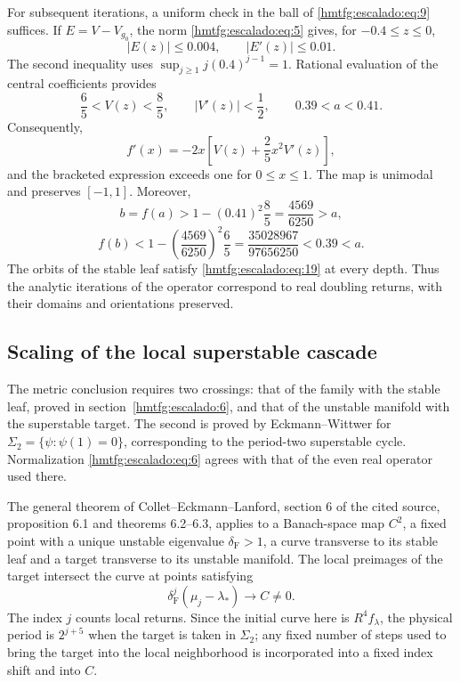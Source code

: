 For subsequent iterations, a uniform check in the ball of \eqref{hmtfg:escalado:eq:9} suffices. If \(E=V-V_{g_0}\), the norm \eqref{hmtfg:escalado:eq:5} gives, for \(-0.4\le z\le0\),
\[
|E(z)|\le0.004,\qquad |E'(z)|\le0.01.
\]
The second inequality uses \(\sup_{j\ge1}j(0.4)^{j-1}=1\). Rational evaluation of the central coefficients provides
\begin{equation}
\frac65<V(z)<\frac85,\qquad |V'(z)|<\frac12,
\qquad 0.39<a<0.41.
\label{hmtfg:escalado:eq:20}
\end{equation}
Consequently,
\[
f'(x)=-2x\left[V(z)+\frac25x^2V'(z)\right],
\]
and the bracketed expression exceeds one for \(0\le x\le1\). The map is unimodal and preserves \([-1,1]\). Moreover,
\[
b=f(a)>1-(0.41)^2\frac85=\frac{4569}{6250}>a,
\]
\begin{equation}
f(b)<1-\left(\frac{4569}{6250}\right)^2\frac65
=\frac{35028967}{97656250}<0.39<a.
\label{hmtfg:escalado:eq:21}
\end{equation}
The orbits of the stable leaf satisfy \eqref{hmtfg:escalado:eq:19} at every depth. Thus the analytic iterations of the operator correspond to real doubling returns, with their domains and orientations preserved.


\subsection{Scaling of the local superstable cascade}
\label{hmtfg:escalado:8}

The metric conclusion requires two crossings: that of the family with the stable leaf, proved in section~\ref{hmtfg:escalado:6}, and that of the unstable manifold with the superstable target. The second is proved by Eckmann–Wittwer for
\(\Sigma_2=\{\psi:\psi(1)=0\}\), corresponding to the period-two superstable cycle. Normalization \eqref{hmtfg:escalado:eq:6} agrees with that of the even real operator used there.

The general theorem of Collet–Eckmann–Lanford, section 6 of the cited source, proposition 6.1 and theorems 6.2–6.3, applies to a Banach-space map \(C^2\), a fixed point with a unique unstable eigenvalue \(\delta_{\mathrm F}>1\), a curve transverse to its stable leaf and a target transverse to its unstable manifold. The local preimages of the target intersect the curve at points satisfying
\begin{equation}
\delta_{\mathrm F}^j(\mu_j-\lambda_*)\longrightarrow C\ne0.
\label{hmtfg:escalado:eq:22}
\end{equation}
The index \(j\) counts local returns. Since the initial curve here is \(R^4f_\lambda\), the physical period is \(2^{j+5}\) when the target is taken in \(\Sigma_2\); any fixed number of steps used to bring the target into the local neighborhood is incorporated into a fixed index shift and into \(C\).

